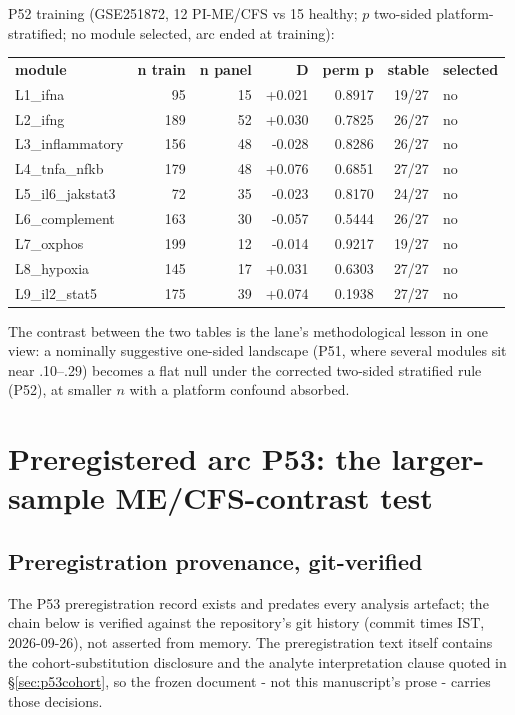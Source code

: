 \documentclass[11pt,a4paper]{article}
\begin{document}
P52 training (GSE251872, 12 PI-ME/CFS vs 15 healthy; $p$ two-sided
platform-stratified; no module selected, arc ended at training):

\begin{longtable}{lrrrrrl}
\textbf{module} & \textbf{n train} & \textbf{n panel} & \textbf{D} & \textbf{perm p} & \textbf{stable} & \textbf{selected}\\
L1_ifna & 95 & 15 & +0.021 & 0.8917 & 19/27 & no \\
L2_ifng & 189 & 52 & +0.030 & 0.7825 & 26/27 & no \\
L3_inflammatory & 156 & 48 & -0.028 & 0.8286 & 26/27 & no \\
L4_tnfa_nfkb & 179 & 48 & +0.076 & 0.6851 & 27/27 & no \\
L5_il6_jakstat3 & 72 & 35 & -0.023 & 0.8170 & 24/27 & no \\
L6_complement & 163 & 30 & -0.057 & 0.5444 & 26/27 & no \\
L7_oxphos & 199 & 12 & -0.014 & 0.9217 & 19/27 & no \\
L8_hypoxia & 145 & 17 & +0.031 & 0.6303 & 27/27 & no \\
L9_il2_stat5 & 175 & 39 & +0.074 & 0.1938 & 27/27 & no \\
\end{longtable}

The contrast between the two tables is the lane's methodological lesson in
one view: a nominally suggestive one-sided landscape (P51, where several
modules sit near .10--.29) becomes a flat null under the corrected two-sided
stratified rule (P52), at smaller $n$ with a platform confound absorbed.


\section{Preregistered arc P53: the larger-sample ME/CFS-contrast test}
\subsection{Preregistration provenance, git-verified}
\label{sec:p53prov}
The P53 preregistration record exists and predates every analysis artefact;
the chain below is verified against the repository's git history (commit
times IST, 2026-09-26), not asserted from memory. The preregistration text
itself contains the cohort-substitution disclosure and the analyte
interpretation clause quoted in \S\ref{sec:p53cohort}, so the frozen
document - not this manuscript's prose - carries those decisions.
\end{document}
